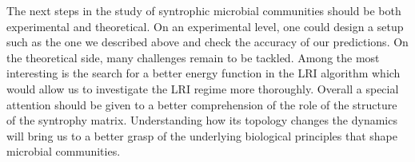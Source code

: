 \documentclass[12pt, titlepage]{report}
\begin{document}
The next steps in the study of syntrophic microbial communities should be both experimental and theoretical. On an experimental level, one could design a setup such as the one we described above and check the accuracy of our predictions. On the theoretical side, many challenges remain to be tackled. Among the most interesting is the search for a better energy function in the LRI algorithm which would allow us to investigate the LRI regime more thoroughly. Overall a special attention should be given to a better comprehension of the role of the structure of the syntrophy matrix. Understanding how its topology changes the dynamics will bring us to a better grasp of the underlying biological principles that shape microbial communities.
\end{document}
